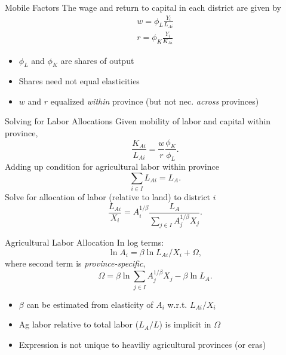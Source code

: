 \documentclass[10pt, xcolor=dvipsnames]{beamer}
\begin{document}
\begin{frame}{Mobile Factors}
The wage and return to capital in each district are given by 
\begin{eqnarray}
    w = \phi_L \frac{Y_i}{L_{Ai}} \\ \nonumber
    r = \phi_K \frac{Y_i}{K_{Ai}} \label{EQ_factorprices}
\end{eqnarray}
\begin{itemize}
  \item $\phi_L$ and $\phi_K$ are shares of output 
  \item Shares need not equal elasticities
  \item $w$ and $r$ equalized \textit{within} province (but not nec. \textit{across} provinces)
\end{itemize}
\end{frame}

\begin{frame}{Solving for Labor Allocations}
Given mobility of labor and capital within province,
\begin{equation}
    \frac{K_{Ai}}{L_{Ai}} = \frac{w}{r}\frac{\phi_K}{\phi_L}.
\end{equation}
Adding up condition for agricultural labor within province
\begin{equation}
\sum_{i\in I} L_{Ai} = L_A.
\end{equation}
Solve for allocation of labor (relative to land) to district $i$
\begin{equation}
\frac{L_{Ai}}{X_i} = A_{i}^{1/\beta}\frac{L_A}{\sum_{j\in I} A_{j}^{1/\beta}X_{j}}. \label{EQ_LaX}
\end{equation}
\end{frame}

\begin{frame}{Agricultural Labor Allocation}
In log terms:
\begin{equation}
\ln A_{i} = \beta \ln L_{Ai}/X_i + \Omega, \label{EQ_est}
\end{equation}
where second term is \textit{province-specific},
\begin{equation}
   \Omega = \beta \ln \sum_{j\in I} A_{j}^{1/\beta}X_{j} - \beta \ln L_A.
\end{equation} 

\begin{itemize}
  \item $\beta$ can be estimated from elasticity of $A_i$ w.r.t. $L_{Ai}/X_i$
  \item Ag labor relative to total labor ($L_A/L$) is implicit in $\Omega$
  \item Expression is not unique to heaviliy agricultural provinces (or eras)
\end{itemize}

\hfill \hyperlink{extend}{}
\end{frame}
\end{document}
